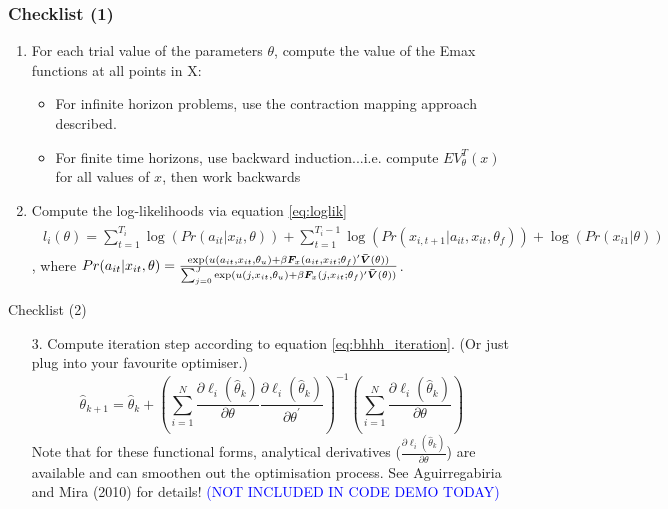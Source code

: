 \documentclass[aspectratio=169]{beamer}
\begin{document}
	\begin{frame}
		\frametitle{Checklist (1)}
		\begin{enumerate}
			\itemsep1em
			\item For each trial value of the parameters $\theta$, compute the value of the Emax functions at all points in X:
			\begin{itemize}
				\item For infinite horizon problems, use the contraction mapping approach described.
				\item For finite time horizons, use backward induction...i.e. compute $EV_\theta^T(x)$ for all values of $x$, then work backwards
			\end{itemize}
			\item Compute the log-likelihoods via equation \ref{eq:loglik} 
			\begin{align*}
				\begin{split}
					l_i(\theta) = \sum_{t=1}^{T_i} \log(Pr(a_{it}|x_{it},\theta))+ \sum_{t=1}^{T_i - 1}\log(Pr(x_{i,t+1}|a_{it},x_{it},\theta_f)) + \log(Pr(x_{i1}|\theta))           
				\end{split}
			\end{align*}
			, where $Pr(a_{it}|x_{it},\theta) = \frac{\exp(u(a_{it},x_{it},\theta_u) + \beta \bm{F}_x(a_{it},x_{it};\theta_f)^\prime \bm{\Bar{V}}(\theta))}{\sum_{j=0}^J\exp(u(j,x_{it},\theta_u) + \beta \bm{F}_x(j,x_{it};\theta_f)^\prime \bm{\Bar{V}}(\theta))}$.
		\end{enumerate}
	\end{frame}
	
	\begin{frame}{Checklist (2)}
		\begin{enumerate}
			\itemsep1em
			\item [3.] Compute iteration step according to equation \ref{eq:bhhh_iteration}. (Or just plug into your favourite optimiser.)
			\begin{equation} \label{eq:bhhh_iteration}
				\hat{\theta}_{k+1} = \hat{\theta}_{k} + \left( \sum_{i=1}^N \frac{\partial \ell_i(\hat{\theta}_k)}{\partial \theta} \frac{\partial \ell_i(\hat{\theta}_k)}{\partial \theta^\prime} \right)^{-1} \left(\sum_{i=1}^N \frac{\partial \ell_i(\hat{\theta}_k)}{\partial \theta} \right)
			\end{equation}
			Note that for these functional forms, analytical derivatives ($\frac{\partial \ell_i(\hat{\theta}_k)}{\partial \theta}$) are available and can smoothen out the optimisation process. See Aguirregabiria and Mira (2010) for details! \textcolor{blue}{(NOT INCLUDED IN CODE DEMO TODAY)}
		\end{enumerate}
	\end{frame}
	
\end{document}
